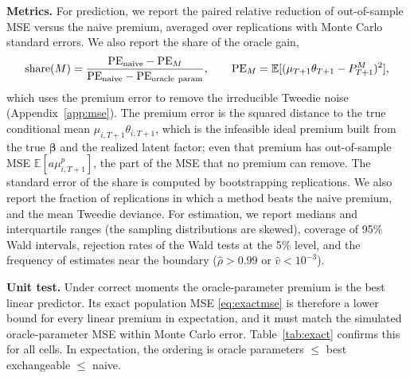 \documentclass[mathematics,article,submit,moreauthors]{Definitions/mdpi}
\newcommand{\E}{\mathbb{E}}
\newcommand{\bbeta}{\boldsymbol{\beta}}
\begin{document}
\textbf{Metrics.} For prediction, we report the paired relative reduction of out-of-sample MSE versus the naive premium, averaged over replications with Monte Carlo standard errors. We also report the share of the oracle gain,
\[
\text{share}(M)=\frac{\mathrm{PE}_{\rm naive}-\mathrm{PE}_M}{\mathrm{PE}_{\rm naive}-\mathrm{PE}_{\rm oracle\ param}},\qquad \mathrm{PE}_M=\E[(\mu_{T+1}\theta_{T+1}-P^M_{T+1})^2],
\]
which uses the premium error to remove the irreducible Tweedie noise (Appendix~\ref{app:mse}). The premium error is the squared distance to the true conditional mean $\mu_{i,T+1}\theta_{i,T+1}$, which is the infeasible ideal premium built from the true $\bbeta$ and the realized latent factor; even that premium has out-of-sample MSE $\E[a\mu_{i,T+1}^p]$, the part of the MSE that no premium can remove. The standard error of the share is computed by bootstrapping replications. We also report the fraction of replications in which a method beats the naive premium, and the mean Tweedie deviance. For estimation, we report medians and interquartile ranges (the sampling distributions are skewed), coverage of 95\% Wald intervals, rejection rates of the Wald tests at the 5\% level, and the frequency of estimates near the boundary ($\hat\rho>0.99$ or $\hat v<10^{-3}$).

\textbf{Unit test.} Under correct moments the oracle-parameter premium is the best linear predictor. Its exact population MSE \eqref{eq:exactmse} is therefore a lower bound for every linear premium in expectation, and it must match the simulated oracle-parameter MSE within Monte Carlo error. Table~\ref{tab:exact} confirms this for all cells. In expectation, the ordering is oracle parameters $\le$ best exchangeable $\le$ naive.
\end{document}
